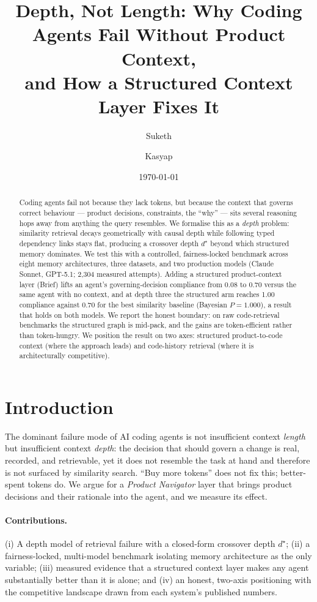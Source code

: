 \documentclass[11pt]{article}
\title{Depth, Not Length: Why Coding Agents Fail Without Product Context,\\
and How a Structured Context Layer Fixes It}
\author[1]{Suketh}
\author[1]{Kasyap}
\affil[1]{Brief}
\date{\today}
\newcommand{\measured}[1]{#1} %
\begin{document}
\maketitle

\begin{abstract}
Coding agents fail not because they lack tokens, but because the context that governs
correct behaviour --- product decisions, constraints, the ``why'' --- sits several
reasoning hops away from anything the query resembles. We formalise this as a
\emph{depth} problem: similarity retrieval decays geometrically with causal depth while
following typed dependency links stays flat, producing a crossover depth $d^\star$ beyond
which structured memory dominates. We test this with a controlled, fairness-locked
benchmark across eight memory architectures, three datasets, and two production models
(Claude Sonnet, GPT-5.1; 2{,}304 measured attempts). Adding a structured product-context
layer (Brief) lifts an agent's governing-decision compliance from \measured{0.08} to
\measured{0.70} versus the same agent with no context, and at depth three the structured
arm reaches \measured{1.00} compliance against \measured{0.70} for the best similarity
baseline (Bayesian $P=1.000$), a result that holds on both models. We report the honest
boundary: on raw code-retrieval benchmarks the structured graph is mid-pack, and the
gains are token-efficient rather than token-hungry. We position the result on two axes:
structured product-to-code context (where the approach leads) and code-history retrieval
(where it is architecturally competitive).
\end{abstract}

\section{Introduction}
The dominant failure mode of AI coding agents is not insufficient context \emph{length}
but insufficient context \emph{depth}: the decision that should govern a change is real,
recorded, and retrievable, yet it does not resemble the task at hand and therefore is not
surfaced by similarity search. ``Buy more tokens'' does not fix this; better-spent tokens
do. We argue for a \emph{Product Navigator} layer that brings product decisions and their
rationale into the agent, and we measure its effect.

\paragraph{Contributions.}
(i) A depth model of retrieval failure with a closed-form crossover depth $d^\star$;
(ii) a fairness-locked, multi-model benchmark isolating memory architecture as the only
variable; (iii) measured evidence that a structured context layer makes any agent
substantially better than it is alone; and (iv) an honest, two-axis positioning with the
competitive landscape drawn from each system's published numbers.
\end{document}
